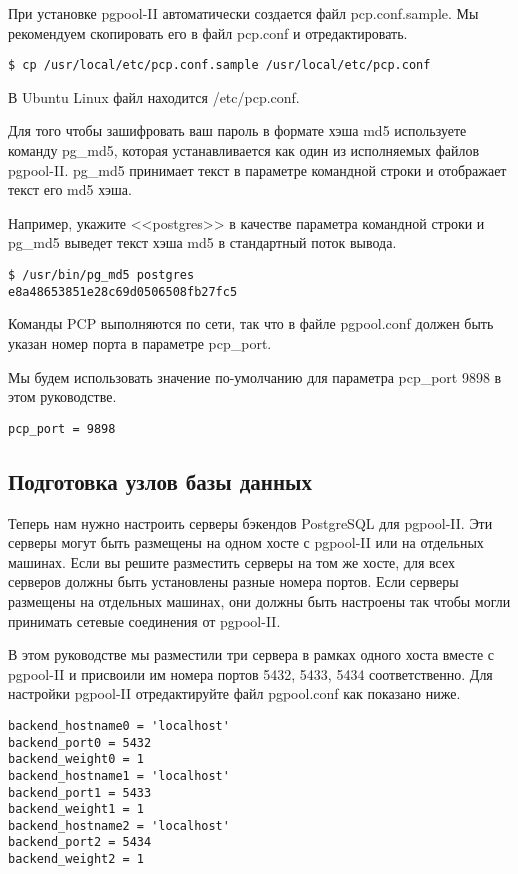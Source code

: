 При установке pgpool-II автоматически создается файл pcp.conf.sample. 
Мы рекомендуем скопировать его в файл pcp.conf и отредактировать.
\begin{verbatim}
$ cp /usr/local/etc/pcp.conf.sample /usr/local/etc/pcp.conf
\end{verbatim}

В Ubuntu Linux файл находится /etc/pcp.conf.

Для того чтобы зашифровать ваш пароль в формате хэша md5 используете команду pg\_md5, которая устанавливается как один из 
исполняемых файлов pgpool-II. pg\_md5 принимает текст в параметре командной строки и отображает текст его md5 хэша.

Например, укажите <<postgres>> в качестве параметра командной строки и pg\_md5 выведет текст хэша md5 в стандартный поток вывода.
\begin{verbatim}
$ /usr/bin/pg_md5 postgres
e8a48653851e28c69d0506508fb27fc5
\end{verbatim}

Команды PCP выполняются по сети, так что в файле pgpool.conf должен быть указан номер порта в параметре pcp\_port.

Мы будем использовать значение по-умолчанию для параметра pcp\_port 9898 в этом руководстве.
\begin{verbatim}
pcp_port = 9898
\end{verbatim}


\subsection{Подготовка узлов базы данных}
Теперь нам нужно настроить серверы бэкендов PostgreSQL для pgpool-II. Эти серверы могут быть размещены на одном 
хосте с pgpool-II или на отдельных машинах. Если вы решите разместить серверы на том же хосте, для всех серверов 
должны быть установлены разные номера портов. Если серверы размещены на отдельных машинах, они должны быть настроены 
так чтобы могли принимать сетевые соединения от pgpool-II.

В этом руководстве мы разместили три сервера в рамках одного хоста вместе с pgpool-II и присвоили им номера портов 
5432, 5433, 5434 соответственно. Для настройки pgpool-II отредактируйте файл pgpool.conf как показано ниже.
\begin{verbatim}
backend_hostname0 = 'localhost'
backend_port0 = 5432
backend_weight0 = 1
backend_hostname1 = 'localhost'
backend_port1 = 5433
backend_weight1 = 1
backend_hostname2 = 'localhost'
backend_port2 = 5434
backend_weight2 = 1
\end{verbatim}

